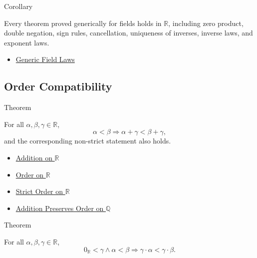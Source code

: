 \begin{corollarybox}{Corollary}
\begin{corollary}
\label{cor:field-laws-on-r}
Every theorem proved generically for fields holds in $\mathbb{R}$, including
zero product, double negation, sign rules, cancellation, uniqueness of
inverses, inverse laws, and exponent laws.
\end{corollary}
\end{corollarybox}

\begin{dependencies}
\begin{itemize}
  \item \hyperref[cor:generic-field-laws]{Generic Field Laws}
\end{itemize}
\end{dependencies}

\subsection*{Order Compatibility}

\begin{theorembox}{Theorem}
\begin{theorem}
\label{thm:addition-preserves-order-on-r}
For all $\alpha,\beta,\gamma\in\mathbb{R}$,
\[
\alpha<\beta \Longrightarrow \alpha+\gamma<\beta+\gamma,
\]
and the corresponding non-strict statement also holds.
\end{theorem}
\end{theorembox}

\begin{dependencies}
\begin{itemize}
  \item \hyperref[def:addition-on-r]{Addition on $\mathbb{R}$}
  \item \hyperref[def:order-on-r]{Order on $\mathbb{R}$}
  \item \hyperref[def:strict-order-on-r]{Strict Order on $\mathbb{R}$}
  \item \hyperref[thm:addition-preserves-order-on-q]{Addition Preserves Order on $\mathbb{Q}$}
\end{itemize}
\end{dependencies}

\begin{theorembox}{Theorem}
\begin{theorem}
\label{thm:positive-multiplication-preserves-order-on-r}
For all $\alpha,\beta,\gamma\in\mathbb{R}$,
\[
0_{\mathbb{R}}<\gamma\land\alpha<\beta
\Longrightarrow
\gamma\cdot\alpha<\gamma\cdot\beta.
\]
\end{theorem}
\end{theorembox}


